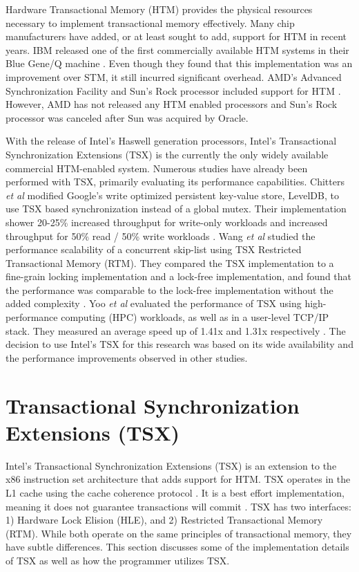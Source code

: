 \documentclass[11pt]{book}
\begin{document}
Hardware Transactional Memory (HTM) provides the physical resources necessary to implement
transactional memory effectively.  Many chip manufacturers have added, or at least sought
to add, support for HTM in recent years.  IBM released one of the first commercially
available HTM systems in their Blue Gene/Q machine \cite{blue_wang}.  Even though they
found that this implementation was an improvement over STM, it still incurred significant
overhead.  AMD's Advanced Synchronization Facility and Sun's Rock processor included
support for HTM \cite{chung_amd,rock_dice}.  However, AMD has not released any HTM enabled
processors and Sun's Rock processor was canceled after Sun was acquired by Oracle.

With the release of Intel's Haswell generation processors, Intel's Transactional
Synchronization Extensions (TSX) is the currently the only widely available commercial
HTM-enabled system.  Numerous studies have already been performed with TSX, primarily
evaluating its performance capabilities.  Chitters \emph{et al} modified Google's write
optimized persistent key-value store, LevelDB, to use TSX based synchronization instead of
a global mutex.  Their implementation shower 20-25\% increased throughput for write-only
workloads and increased throughput for 50\% read / 50\% write workloads
\cite{chitters_tsx}.  Wang \emph{et al} studied the performance scalability of a
concurrent skip-list using TSX Restricted Transactional Memory (RTM).  They compared the
TSX implementation to a fine-grain locking implementation and a lock-free implementation,
and found that the performance was comparable to the lock-free implementation without the
added complexity \cite{wang_tsx}.  Yoo \emph{et al} evaluated the performance of TSX using
high-performance computing (HPC) workloads, as well as in a user-level TCP/IP stack.  They
measured an average speed up of 1.41x and 1.31x respectively \cite{yoo_tsx}.  The decision
to use Intel's TSX for this research was based on its wide availability and the
performance improvements observed in other studies.


\section{Transactional Synchronization Extensions (TSX)}

Intel's Transactional Synchronization Extensions (TSX) is an extension to the x86
instruction set architecture that adds support for HTM.  TSX operates in the L1 cache
using the cache coherence protocol \cite{intel_opt_man}.  It is a best effort
implementation, meaning it does not guarantee transactions will commit
\cite{intel_prog_ref}.  TSX has two interfaces: 1) Hardware Lock Elision (HLE), and 2)
Restricted Transactional Memory (RTM).  While both operate on the same principles of
transactional memory, they have subtle differences.  This section discusses some of the
implementation details of TSX as well as how the programmer utilizes TSX.
\end{document}
